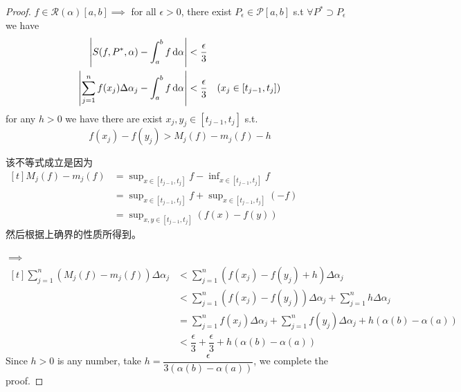 \documentclass[
	UTF-8,
	11pt, %
	a4paper, %
]{LegrandOrangeBook}
\begin{document}
    \begin{proof}
        $f \in \mathcal{R}(\alpha)[a,b] \implies $ for all  $\epsilon > 0$, 
        there exist $P_{\epsilon} \in \mathcal{P}[a,b]$ s.t $\forall P^{*} \supset P_{\epsilon}$ we have
        $$
        \begin{aligned}[t]
            \left| S(f,P^{*},\alpha) - \int_{a}^{b} f \, \mathrm{d} \alpha \right| &< \dfrac{\epsilon}{3} \\
            \left| \sum_{j=1}^{n}f(x_j)\Delta \alpha_j - \int_{a}^{b} f \, \mathrm{d} \alpha \right|&< \dfrac{\epsilon}{3} \quad (x_j \in [t_{j-1}, t_j]) 
        \end{aligned}
        $$
        for any $h > 0$ we have there are exist  $x_j,y_j \in [t_{j-1}, t_j]$ s.t.
        $$f(x_j) - f(y_j) > M_j (f) - m_j (f) - h$$
        \begin{remark}
            该不等式成立是因为
            $
            \begin{aligned}[t]
            M_j (f) - m_j (f) &= \sup_{x \in [t_{j-1}, t_j]} f - \inf_{x \in [t_{j-1}, t_j]} f \\
                            &= \sup_{x \in [t_{j-1}, t_j]} f + \sup_{x \in [t_{j-1}, t_j]} (-f) \\
                            &= \sup_{x, y \in [t_{j-1}, t_j]}( f(x) - f(y) )
            \end{aligned}
            $\\
            然后根据上确界的性质所得到。
        \end{remark}
        \noindent$\implies$
        $
        \begin{aligned}[t]
            \sum_{j=1}^{n}\left( M_j(f) - m_j(f) \right)\Delta \alpha_j  
            &< \sum_{j=1}^{n}\left( f(x_j) - f(y_j) +h \right)\Delta \alpha_j \\
            &<\sum_{j=1}^{n}\left( f(x_j) - f(y_j) \right)\Delta \alpha_j + \sum_{j=1}^{n} h \Delta \alpha_j \\
            &=\sum_{j=1}^{n} f(x_j) \Delta \alpha_j + \sum_{j=1}^{n} f(y_j) \Delta \alpha_j + h(\alpha(b) - \alpha(a))\\
            &< \dfrac{\epsilon}{3} + \dfrac{\epsilon}{3} + h(\alpha(b) - \alpha(a))
        \end{aligned}
        $\\

        Since $h>0$ is any number, take $h = \dfrac{\epsilon}{3(\alpha(b) - \alpha(a))}$, 
        we complete the proof.
        
    \end{proof}
\end{document}
